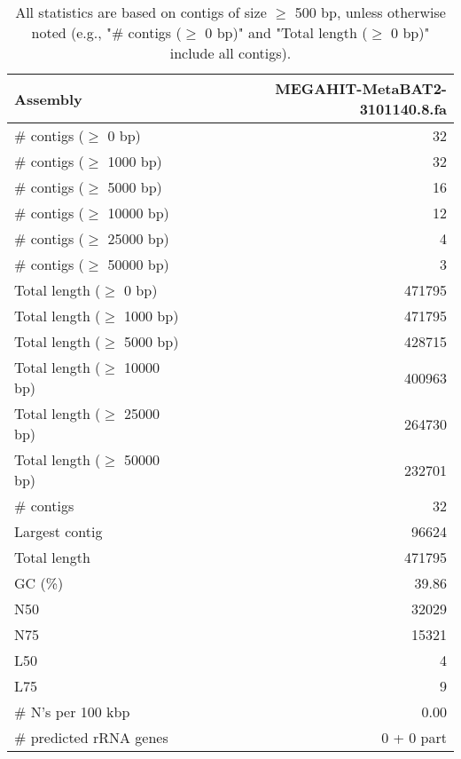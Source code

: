 \documentclass[12pt,a4paper]{article}
\begin{document}
\begin{table}[ht]
\begin{center}
\caption{All statistics are based on contigs of size $\geq$ 500 bp, unless otherwise noted (e.g., "\# contigs ($\geq$ 0 bp)" and "Total length ($\geq$ 0 bp)" include all contigs).}
\begin{tabular}{|l*{1}{|r}|}
\hline
Assembly & MEGAHIT-MetaBAT2-3101140.8.fa \\ \hline
\# contigs ($\geq$ 0 bp) & 32 \\ \hline
\# contigs ($\geq$ 1000 bp) & 32 \\ \hline
\# contigs ($\geq$ 5000 bp) & 16 \\ \hline
\# contigs ($\geq$ 10000 bp) & 12 \\ \hline
\# contigs ($\geq$ 25000 bp) & 4 \\ \hline
\# contigs ($\geq$ 50000 bp) & 3 \\ \hline
Total length ($\geq$ 0 bp) & 471795 \\ \hline
Total length ($\geq$ 1000 bp) & 471795 \\ \hline
Total length ($\geq$ 5000 bp) & 428715 \\ \hline
Total length ($\geq$ 10000 bp) & 400963 \\ \hline
Total length ($\geq$ 25000 bp) & 264730 \\ \hline
Total length ($\geq$ 50000 bp) & 232701 \\ \hline
\# contigs & 32 \\ \hline
Largest contig & 96624 \\ \hline
Total length & 471795 \\ \hline
GC (\%) & 39.86 \\ \hline
N50 & 32029 \\ \hline
N75 & 15321 \\ \hline
L50 & 4 \\ \hline
L75 & 9 \\ \hline
\# N's per 100 kbp & 0.00 \\ \hline
\# predicted rRNA genes & 0 + 0 part \\ \hline
\end{tabular}
\end{center}
\end{table}
\end{document}

